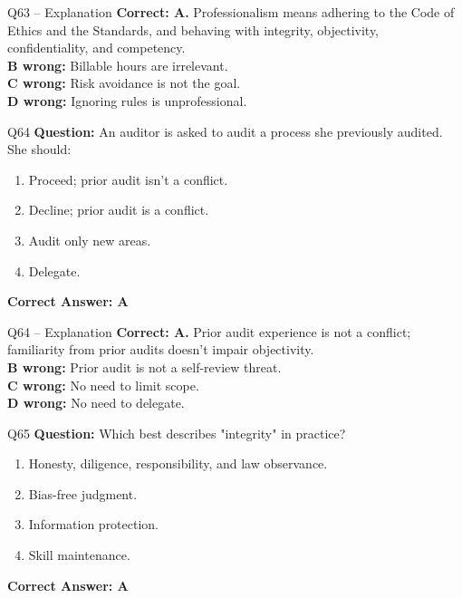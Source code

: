 \documentclass[aspectratio=169,10pt]{beamer}
\begin{document}
	\begin{frame}[t]{Q63 -- Explanation}
		\small
		\textbf{Correct: A.} Professionalism means adhering to the Code of Ethics and the Standards, and behaving with integrity, objectivity, confidentiality, and competency. \\[4pt]
		\textbf{B wrong:} Billable hours are irrelevant. \\[2pt]
		\textbf{C wrong:} Risk avoidance is not the goal. \\[2pt]
		\textbf{D wrong:} Ignoring rules is unprofessional.
	\end{frame}
	
	\begin{frame}[t]{Q64}
		\small
		\textbf{Question:} An auditor is asked to audit a process she previously audited. She should:
		\begin{enumerate}[label=\Alph*.,itemsep=1pt,topsep=2pt]
			\item Proceed; prior audit isn't a conflict.
			\item Decline; prior audit is a conflict.
			\item Audit only new areas.
			\item Delegate.
		\end{enumerate}
		\vspace{4pt}
		\textbf{Correct Answer: A}
	\end{frame}
	
	\begin{frame}[t]{Q64 -- Explanation}
		\small
		\textbf{Correct: A.} Prior audit experience is not a conflict; familiarity from prior audits doesn't impair objectivity. \\[4pt]
		\textbf{B wrong:} Prior audit is not a self-review threat. \\[2pt]
		\textbf{C wrong:} No need to limit scope. \\[2pt]
		\textbf{D wrong:} No need to delegate.
	\end{frame}
	
	\begin{frame}[t]{Q65}
		\small
		\textbf{Question:} Which best describes "integrity" in practice?
		\begin{enumerate}[label=\Alph*.,itemsep=1pt,topsep=2pt]
			\item Honesty, diligence, responsibility, and law observance.
			\item Bias-free judgment.
			\item Information protection.
			\item Skill maintenance.
		\end{enumerate}
		\vspace{4pt}
		\textbf{Correct Answer: A}
	\end{frame}
	
\end{document}
